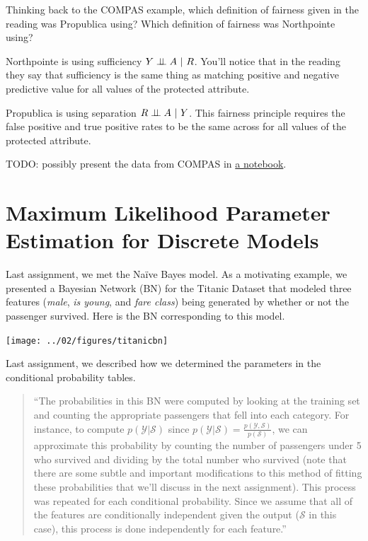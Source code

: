 \documentclass[assignment03_Solutions]{subfiles}
\begin{document}
\begin{exercise}[(5 minutes)]
Thinking back to the COMPAS example, which definition of fairness given in the reading was Propublica using?  Which definition of fairness was Northpointe using?

\begin{boxedsolution}
\bi
\item Northpointe is using sufficiency $Y \perp\!\!\!\perp A~|~R$.  You'll notice that in the reading they say that sufficiency is the same thing as matching positive and negative predictive value for all values of the protected attribute.
\item Propublica is using separation $R \perp\!\!\!\perp A~|~Y$.  This fairness principle requires the false positive and true positive rates to be the same across for all values of the protected attribute.
\ei
\end{boxedsolution}
\end{exercise}

TODO: possibly present the data from COMPAS in \href{https://colab.research.google.com/drive/1HMX0GJAF0PcCn6INfCoeqNOASJri_V_s}{a notebook}.

\section{Maximum Likelihood Parameter Estimation for Discrete Models}
Last assignment, we met the Na\"ive Bayes model.  As a motivating example, we presented a Bayesian Network (BN) for the Titanic Dataset that modeled three features (\emph{male}, \emph{is young}, and \emph{fare class}) being generated by whether or not the passenger survived.  Here is the BN corresponding to this model.

\begin{center}
\texttt{[image: ../02/figures/titanicbn]}
\end{center}

Last assignment, we described how we determined the parameters in the conditional probability tables.
\begin{quote}
``The probabilities in this BN were computed by looking at the training set and counting the appropriate passengers that fell into each category.  For instance, to compute $p(\mathcal{Y}|\mathcal{S})$ since $p(\mathcal{Y}|\mathcal{S}) = \frac{p(\mathcal{Y}, \mathcal{S})}{p(\mathcal{S})}$, we can approximate this probability by counting the number of passengers under 5 who survived and dividing by the total number who survived (note that there are some subtle and important modifications to this method of fitting these probabilities that we'll discuss in the next assignment).  This process was repeated for each conditional probability.  Since we assume that all of the features are conditionally independent given the output ($\mathcal{S}$ in this case), this process is done independently for each feature.''
\end{quote}
\end{document}
